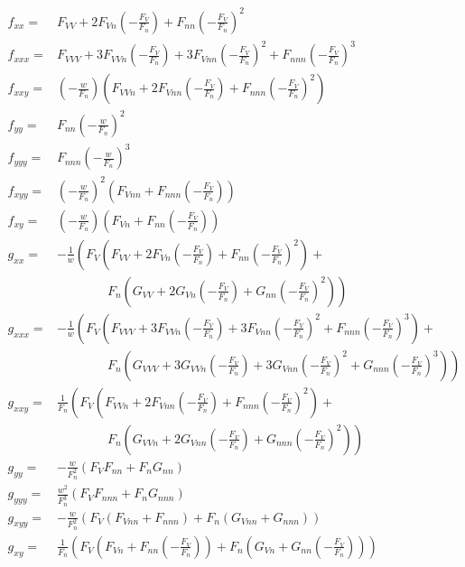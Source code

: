 \documentclass{article}
\theoremstyle{lemma}
\begin{document}
\begin{align}
f_{xx}=&F_{VV}+2F_{Vn}\left(-\frac{F_V}{F_n}\right)+F_{nn}\left(-\frac{F_V}{F_n}\right)^2\nonumber\\
f_{xxx}=&F_{VVV}+3F_{VVn}\left(-\frac{F_V}{F_n}\right)+3F_{Vnn}\left(-\frac{F_V}{F_n}\right)^2+F_{nnn}\left(-\frac{F_V}{F_n}\right)^3\nonumber\\
f_{xxy}=&\left(-\frac{w}{F_n}\right)\left(F_{VVn}+2F_{Vnn}\left(-\frac{F_V}{F_n}\right)+F_{nnn}\left(-\frac{F_V}{F_n}\right)^2\right)\nonumber\\
f_{yy}=&F_{nn}\left(-\frac{w}{F_n}\right)^2\nonumber\\
f_{yyy}=&F_{nnn}\left(-\frac{w}{F_n}\right)^3\nonumber\\
f_{xyy}=&\left(-\frac{w}{F_n}\right)^2\left(F_{Vnn}+F_{nnn}\left(-\frac{F_V}{F_n}\right)\right)\nonumber\\
f_{xy}=&\left(-\frac{w}{F_n}\right)\left(F_{Vn}+F_{nn}\left(-\frac{F_V}{F_n}\right)\right)\nonumber\\
g_{xx}=&-\frac{1}{w}\left(F_V\left(F_{VV}+2F_{Vn}\left(-\frac{F_V}{F_n}\right)+F_{nn}\left(-\frac{F_V}{F_n}\right)^2\right)+\right.\nonumber\\
&\qquad\qquad\left.F_n\left(G_{VV}+2G_{Vn}\left(-\frac{F_V}{F_n}\right)+G_{nn}\left(-\frac{F_V}{F_n}\right)^2\right)\right)\nonumber\\
g_{xxx}=&-\frac{1}{w}\left(F_V\left(F_{VVV}+3F_{VVn}\left(-\frac{F_V}{F_n}\right)+3F_{Vnn}\left(-\frac{F_V}{F_n}\right)^2+F_{nnn}\left(-\frac{F_V}{F_n}\right)^3\right)+\right.\nonumber\\
&\qquad\qquad\left.F_n\left(G_{VVV}+3G_{VVn}\left(-\frac{F_V}{F_n}\right)+3G_{Vnn}\left(-\frac{F_V}{F_n}\right)^2+G_{nnn}\left(-\frac{F_V}{F_n}\right)^3\right)\right)\nonumber\\
g_{xxy}=&\frac{1}{F_n}\left(F_V\left(F_{VVn}+2F_{Vnn}\left(-\frac{F_V}{F_n}\right)+F_{nnn}\left(-\frac{F_V}{F_n}\right)^2\right)+\right.\nonumber\\
&\qquad\qquad\left.F_n\left(G_{VVn}+2G_{Vnn}\left(-\frac{F_V}{F_n}\right)+G_{nnn}\left(-\frac{F_V}{F_n}\right)^2\right)\right)\nonumber\\
g_{yy}=&-\frac{w}{F_n^2}(F_VF_{nn}+F_nG_{nn})\nonumber\\
g_{yyy}=&\frac{w^2}{F_n^3}(F_VF_{nnn}+F_nG_{nnn})\nonumber\\
g_{xyy}=&-\frac{w}{F_n^2}(F_V(F_{Vnn}+F_{nnn})+F_n(G_{Vnn}+G_{nnn}))\nonumber\\
g_{xy}=&\frac{1}{F_n}\left(F_V\left(F_{Vn}+F_{nn}\left(-\frac{F_V}{F_n}\right)\right)+F_n\left(G_{Vn}+G_{nn}\left(-\frac{F_V}{F_n}\right)\right)\right)\nonumber
\end{align}
\end{document}
